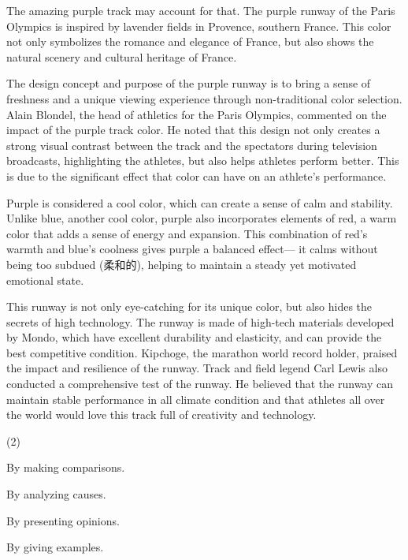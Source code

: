 \documentclass{英语试卷}
\begin{document}
\par The amazing purple track may account for that. The purple runway of the Paris Olympics is inspired by lavender fields in Provence, southern France. This color not only symbolizes the romance and elegance of France, but also shows the natural scenery and cultural heritage of France.\par
\par The design concept and purpose of the purple runway is to bring a sense of freshness and a unique viewing experience through non-traditional color selection. Alain Blondel, the head of athletics for the Paris Olympics, commented on the impact of the purple track color. He noted that this design not only creates a strong visual contrast between the track and the spectators during television broadcasts, highlighting the athletes, but also helps athletes perform better. This is due to the significant effect that color can have on an athlete's performance.\par
\par Purple is considered a cool color, which can create a sense of calm and stability. Unlike blue, another cool color, purple also incorporates elements of red, a warm color that adds a sense of energy and expansion. This combination of red's warmth and blue's coolness gives purple a balanced effect— it calms without being too subdued (柔和的), helping to maintain a steady yet motivated emotional state.\par
\par This runway is not only eye-catching for its unique color, but also hides the secrets of high technology. The runway is made of high-tech materials developed by Mondo, which have excellent durability and elasticity, and can provide the best competitive condition. Kipchoge, the marathon world record holder, praised the impact and resilience of the runway. Track and field legend Carl Lewis also conducted a comprehensive test of the runway. He believed that the runway can maintain stable performance in all climate condition and that athletes all over the world would love this track full of creativity and technology.\par
{}
\begin{choices}(2)
  \item By making comparisons.
  \item By analyzing causes.
  \item By presenting opinions.
  \item By giving examples.
\end{choices}
\end{document}
